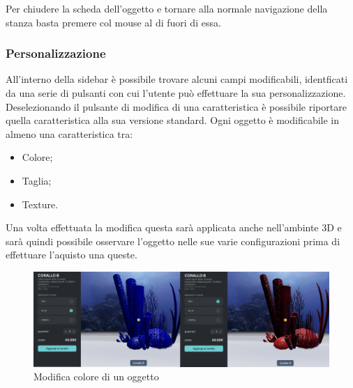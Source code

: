 Per chiudere la scheda dell'oggetto e tornare alla normale navigazione della stanza basta premere col mouse al di fuori di essa.
\subsubsection{Personalizzazione}
All'interno della sidebar è possibile trovare alcuni campi modificabili, identficati da una serie di pulsanti con cui l'utente può effettuare la sua personalizzazione.
Deselezionando il pulsante di modifica di una caratteristica è possibile riportare quella caratteristica alla sua versione standard.
Ogni oggetto è modificabile in almeno una caratteristica tra:
\begin{itemize}
	\item Colore;
	\item Taglia;
	\item Texture.
\end{itemize}
Una volta effettuata la modifica questa sarà applicata anche nell'ambinte 3D e sarà quindi possibile osservare l'oggetto nelle sue varie configurazioni prima di effettuare l'aquisto una queste.
\begin{figure}[H]
  \renewcommand{\thefigure}{2}
\begin{center}
  \includegraphics[width=\linewidth]{./res/images/modifica.png}
\end{center}
  \caption{Modifica colore di un oggetto}
  \label{Modifica colore di un oggetto}
\end{figure}
\pagebreak

